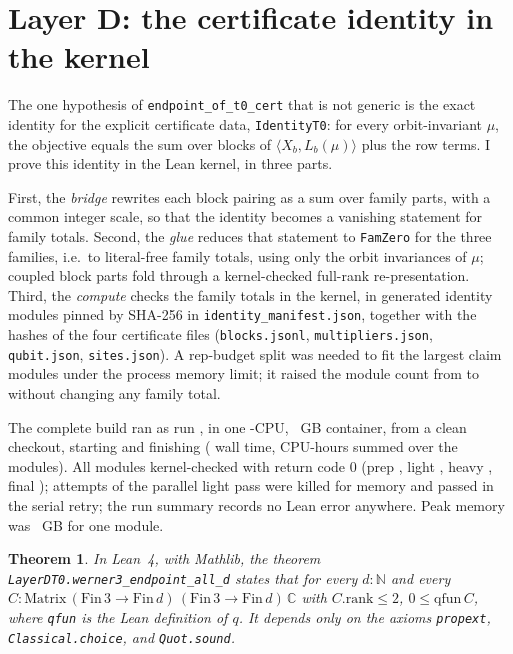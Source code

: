 \documentclass[11pt]{article}
\newtheorem{theorem}{Theorem}
\theoremstyle{remark}
\newcommand{\C}{\mathbb{C}}
\begin{document}
\section{Layer D: the certificate identity in the kernel}\label{sec:lean}

The one hypothesis of \texttt{endpoint\_of\_t0\_cert} that is not generic
is the exact identity for the explicit certificate data, \texttt{IdentityT0}:
for every orbit-invariant $\mu$, the objective equals the sum over blocks
of $\langle X_b, L_b(\mu) \rangle$ plus the row terms.
I prove this identity in the Lean kernel, in three parts.

First, the \emph{bridge} rewrites each block pairing as a sum over family
parts, with a common integer scale, so that the identity becomes a
vanishing statement for family totals.
Second, the \emph{glue} reduces that statement to \texttt{FamZero} for
the three families, i.e.\ to literal-free family totals, using only the
orbit invariances of $\mu$; coupled block parts fold through a
kernel-checked full-rank re-presentation.
Third, the \emph{compute} checks the family totals in the kernel, in
\nmodules{} generated identity modules pinned by SHA-256 in
\texttt{identity\_manifest.json}, together with the hashes of the four
certificate files (\texttt{blocks.jsonl}, \texttt{multipliers.json},
\texttt{qubit.json}, \texttt{sites.json}).
A rep-budget split was needed to fit the largest claim modules under
the process memory limit; it raised the module count from \nmodulesbefore{} to
\nmodules{} without changing any family total.

The complete build ran as run \runid{}, in one
\ncpu{}-CPU, \containergb{}~GB container, from a clean checkout, starting
\runstart{} and finishing \runend{}
(\walltime{} wall time, \cpuhours{} CPU-hours summed over the modules).
All \nmodules{} modules kernel-checked with return code $0$
(prep \nprep{}, light \nlight{}, heavy \nheavy{}, final \nfinal{});
\nretries{} attempts of the parallel light pass were killed for memory and passed
in the serial retry; the run summary records no Lean error anywhere.
Peak memory was \peakmem{}~GB for one module.

\begin{theorem}\label{thm:lean}
In Lean~4, with Mathlib, the theorem
\texttt{LayerDT0.werner3\_endpoint\_all\_d} states that for every
$d : \mathbb{N}$ and every
$C : \mathrm{Matrix}\,(\mathrm{Fin}\,3 \to \mathrm{Fin}\,d)\,
(\mathrm{Fin}\,3 \to \mathrm{Fin}\,d)\,\C$ with $C.\mathrm{rank} \le 2$,
$0 \le \mathrm{qfun}\,C$, where \texttt{qfun} is the Lean definition of $q$.
It depends only on the axioms \texttt{propext},
\texttt{Classical.choice}, and \texttt{Quot.sound}.
\end{theorem}
\end{document}
